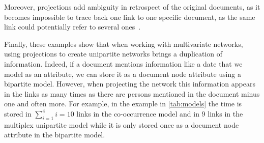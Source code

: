 Moreover, projections add ambiguity in retrospect of the original documents, as it becomes impossible to trace back one link to one specific document, as the same link could potentially refer to several ones~\cite{cristofoliAuxSourcesGrands2008}.

Finally, these examples show that when working with multivariate networks, using projections to create unipartite networks brings a duplication of information.
Indeed, if a document mentions information like a date that we model as an attribute, we can store it as a document node attribute using a bipartite model.
However, when projecting the network this information appears in the links as many times as there are persons mentioned in the document minus one and often more.
For example, in the example \pascal in \autoref{tab:models} the time is stored in $\sum_{i=1} ^{4} i = 10$ links in the co-occurrence model and in 9 links in the multiplex unipartite model while it is only stored once as a document node attribute in the bipartite model.

